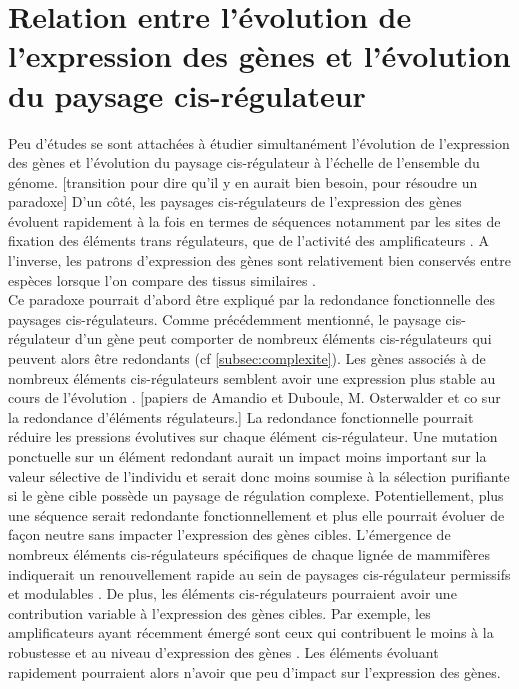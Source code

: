 \section{Relation entre l’évolution de l’expression des gènes et l’évolution du paysage \gls{cis}-régulateur}
\label{sec:relation-paysage-exp}

Peu d’études se sont attachées à étudier simultanément l’évolution de l’expression des gènes et l’évolution du paysage \gls{cis}-régulateur à l’échelle de l’ensemble du génome. [transition pour dire qu’il y en aurait bien besoin, pour résoudre un paradoxe] D’un côté, les paysages \gls{cis}-régulateurs de l’expression des gènes évoluent rapidement à la fois en termes de séquences notamment par les sites de fixation des éléments trans régulateurs, que de l’activité des \glspl{amplificateur} \citep{cheng_principles_2014, villar_enhancer_2015}. A l'inverse, les patrons d’expression des gènes sont relativement bien conservés entre espèces lorsque l’on compare des tissus similaires \citep{brawand_evolution_2011, necsulea_evolutionary_2014, cardoso-moreira_gene_2019}. \\

Ce paradoxe pourrait d’abord être expliqué par la redondance fonctionnelle des paysages \gls{cis}-régulateurs. Comme précédemment mentionné, le paysage \gls{cis}-régulateur d’un gène peut comporter de nombreux éléments \gls{cis}-régulateurs qui peuvent alors être redondants (cf \ref{subsec:complexite}). Les gènes associés à de nombreux éléments \gls{cis}-régulateurs semblent avoir une expression plus stable au cours de l’évolution \citep{berthelot_complexity_2018}. [papiers de Amandio et Duboule, M. Osterwalder et co sur la redondance d’éléments régulateurs.] La redondance fonctionnelle pourrait réduire les pressions évolutives sur chaque élément \gls{cis}-régulateur. Une mutation ponctuelle sur un élément redondant aurait un impact moins important sur la valeur sélective de l’individu et serait donc moins soumise à la sélection purifiante si le gène cible possède un paysage de régulation complexe. Potentiellement, plus une séquence serait redondante fonctionnellement et plus elle pourrait évoluer de façon neutre sans impacter l’expression des gènes cibles. L’émergence de nombreux éléments \gls{cis}-régulateurs spécifiques de chaque lignée de mammifères indiquerait un renouvellement rapide au sein de paysages \gls{cis}-régulateur permissifs et modulables \citep{villar_enhancer_2015}. De plus, les éléments \gls{cis}-régulateurs pourraient avoir une contribution variable à l’expression des gènes cibles. Par exemple, les \glspl{amplificateur} ayant récemment émergé sont ceux qui contribuent le moins à la robustesse et au niveau d’expression des gènes \citep{berthelot_complexity_2018}. Les éléments évoluant rapidement pourraient alors n’avoir que peu d’impact sur l’expression des gènes.\\

